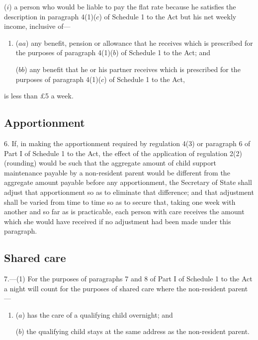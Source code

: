 \documentclass[12pt,a4paper]{article}
\begin{document}
\begin{enumerate}
($i$) a person who would be liable to pay the flat rate because he satisfies the description in paragraph 4(1)($c$)  of Schedule 1 to the Act but his net weekly income, inclusive of—
\begin{enumerate}\item[]
($aa$) any benefit, pension or allowance that he receives which is prescribed for the purposes of paragraph 4(1)($b$)  of Schedule 1 to the Act; and

($bb$) any benefit that he or his partner receives which is prescribed for the purposes of paragraph 4(1)($c$)  of Schedule 1 to the Act,
\end{enumerate}
is less than £5 a week.
\end{enumerate}


\subsection[6. Apportionment]{Apportionment}

6.  If, in making the apportionment required by regulation 4(3) or paragraph 6 of Part I of Schedule 1 to the Act, the effect of the application of regulation 2(2) (rounding) would be such that the aggregate amount of child support maintenance payable by a non-resident parent would be different from the aggregate amount payable before any apportionment, the Secretary of State shall adjust that apportionment so as to eliminate that difference; and that adjustment shall be varied from time to time so as to secure that, taking one week with another and so far as is practicable, each person with care receives the amount which she would have received if no adjustment had been made under this paragraph.

\subsection[7. Shared care]{Shared care}

7.---(1)  For the purposes of paragraphs 7 and 8 of Part I of Schedule 1 to the Act a night will count for the purposes of shared care where the non-resident parent—
\begin{enumerate}\item[]
($a$) has the care of a qualifying child overnight; and

($b$) the qualifying child stays at the same address as the non-resident parent.
\end{enumerate}
\end{document}
